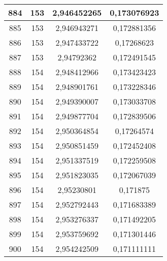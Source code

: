 {\begin{minipage}[!h]{0.45\textwidth}
\begin{longtable}{cccc}
884 & 153 & 2,946452265 & 0,173076923 \\ \hline
885 & 153 & 2,946943271 & 0,172881356 \\ \hline
886 & 153 & 2,947433722 & 0,17268623 \\ \hline
887 & 153 & 2,94792362 & 0,172491545 \\ \hline
888 & 154 & 2,948412966 & 0,173423423 \\ \hline
889 & 154 & 2,948901761 & 0,173228346 \\ \hline
890 & 154 & 2,949390007 & 0,173033708 \\ \hline
891 & 154 & 2,949877704 & 0,172839506 \\ \hline
892 & 154 & 2,950364854 & 0,17264574 \\ \hline
893 & 154 & 2,950851459 & 0,172452408 \\ \hline
894 & 154 & 2,951337519 & 0,172259508 \\ \hline
895 & 154 & 2,951823035 & 0,172067039 \\ \hline
896 & 154 & 2,95230801 & 0,171875 \\ \hline
897 & 154 & 2,952792443 & 0,171683389 \\ \hline
898 & 154 & 2,953276337 & 0,171492205 \\ \hline
899 & 154 & 2,953759692 & 0,171301446 \\ \hline
900 & 154 & 2,954242509 & 0,171111111 \\ \hline
\end{longtable}
\end{minipage}

}
